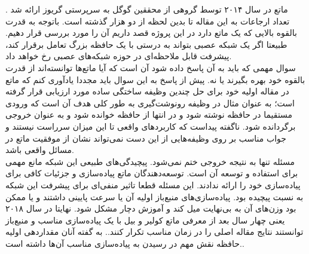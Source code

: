 ماتع در سال ۲۰۱۴ توسط گروهی از محققین گوگل به سرپرستی گریوز ارائه شد \cite{graves2014neural}. تعداد ارجاعات به این مقاله تا بدین لحظه از دو هزار گذشته است. باتوجه به قدرت بالقوه‌ بالایی که یک ماتع دارد در این پروژه قصد داریم آن را مورد بررسی قرار دهیم. طبیعتا اگر یک شبکه عصبی بتواند به درستی با یک حافظه بزرگ تعامل برقرار کند، پیشرفت قابل ملاحظه‌ای در حوزه شبکه‌های عصبی رخ خواهد داد.
\\

سوال مهمی که باید به آن پاسخ داده شود آن است که آیا ماتع‌ها توانسته‌اند از قدرت بالقوه خود بهره بگیرند یا نه. پیش از پاسخ به این سوال باید مجددا یادآوری کنم که ماتع در مقاله اولیه خود برای حل چندین وظیفه ساختگی ساده مورد ارزیابی قرار گرفته است؛ به عنوان مثال در وظیفه رونوشت‌گیری به طور کلی هدف آن است که ورودی مستقیما در حافظه نوشته شود و در انتها از حافظه خوانده شود و به عنوان خروجی برگردانده شود. ناگفته پیداست که کاربردهای واقعی تا این میزان سرراست نیستند و جواب مناسب بر روی وظیفه‌هایی از این دست نمی‌تواند نشان از موفقیت ماتع در مسائل واقعی باشد.
\\

مسئله تنها به نتیجه خروجی ختم نمی‌شود. پیچیدگی‌های طبیعی این شبکه مانع مهمی برای استفاده و توسعه آن است. توسعه‌دهندگان ماتع پیاده‌سازی و جزئیات کافی برای پیاده‌سازی خود را ارائه ندادند\cite{collier2018implementing}. این مسئله قطعا تاثیر منفی‌ای برای پیشرفت این شبکه به نسبت پیچیده بود. پیاده‌سازی‌های منبع‌باز اولیه آن یا سرعت پایینی داشتند و یا ممکن بود وزن‌های آن به بی‌نهایت میل کند و آموزش دچار مشکل شود. نهایتا در سال ۲۰۱۸ یعنی چهار سال بعد از معرفی ماتع کولیر و بیل  با یک پیاده‌سازی مناسب و منبع‌باز توانستند نتایج مقاله اصلی را در زمان مناسب تکرار کنند.\cite{collier2018implementing}. به گفته آنان مقداردهی اولیه حافظه نقش مهم در رسیدن به پیاده‌سازی مناسب آن‌ها داشته است.\cite{collier2018implementing}.
\\

